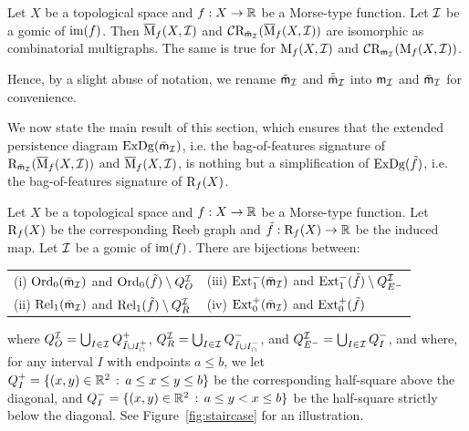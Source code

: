 \begin{lem}\label{lem:idemMapper}
Let $X$ be a topological space and $f:X\rightarrow\mathbb{R}$ be a Morse-type function.
Let $\mathcal{I}$ be a gomic of $\mathrm{im}(f)$.
Then $\overline{\mathrm{M}}_f(X,\mathcal{I})$ and $\mathcal C\mathrm{R}_{\bar {\sf{m}}_{\mathcal I}}(\overline{\mathrm{M}}_f(X,\mathcal{I}))$ are isomorphic as combinatorial multigraphs.
The same is true for $\mathrm{M}_f(X,\mathcal{I})$ and $\mathcal C\mathrm{R}_{{\sf m}_{\mathcal I}}(\mathrm{M}_f(X,\mathcal{I}))$.
\end{lem}  


Hence, by a slight abuse of notation, we rename $\tilde{\sf m}_{\mathcal{I}}$ %
and  $\tilde{\bar{\sf m}}_{\mathcal{I}}$ %
into ${\sf m}_{\mathcal I}$ and $\bar {\sf{m}}_{\mathcal I}$ for convenience. 

We now state the main result of this section, which ensures that the extended persistence diagram $\mathrm{ExDg}(\bar {\sf{m}}_{\mathcal I})$, i.e. the bag-of-features signature of 
$\mathrm{R}_{\bar {\sf{m}}_{\mathcal I}}(\overline{\mathrm{M}}_f(X,\mathcal{I}))$ and $\overline{\mathrm{M}}_f(X,\mathcal{I})$,  
is nothing but a simplification of  $\mathrm{ExDg}(\tilde f)$, i.e. the bag-of-features signature of $\mathrm{R}_{f}(X)$.

\begin{thm}
\label{th:ExDgMultiNerve}
Let $X$ be a topological space and $f:X\rightarrow\mathbb{R}$ be a Morse-type function. Let $\mathrm{R}_f(X)$ be the corresponding Reeb graph
and $\tilde f : \mathrm{R}_f(X)\rightarrow\mathbb{R}$ be the induced map.
Let $\mathcal{I}$ be a gomic of ${\rm im}(f)$. %
There are bijections between:

\begin{center}
\begin{tabular}{ll}
{\rm (i)} %
$\mathrm{Ord}_0(\bar {\sf{m}}_{\mathcal I})$ 
and $\mathrm{Ord}_0(\tilde f)\setminus Q_O^{\mathcal{I}}$ & 
{\rm (iii)} %
$\mathrm{Ext}_1^-(\bar {\sf{m}}_{\mathcal I})$ 
and $\mathrm{Ext}_1^-(\tilde f)\setminus Q_{E^-}^{\mathcal{I}}$\\[0.5em]
{\rm (ii)} %
$\mathrm{Rel}_1(\bar {\sf{m}}_{\mathcal I})$ 
and $\mathrm{Rel}_1(\tilde f)\setminus Q_R^{\mathcal{I}}$ &
{\rm (iv)} %
$\mathrm{Ext}_0^+(\bar {\sf{m}}_{\mathcal I})$ 
and $\mathrm{Ext}_0^+(\tilde f)$
\end{tabular}
\end{center}
where $Q_O^{\mathcal I}=\bigcup_{I\in\mathcal{I}}Q_{{\tilde I}\cup I_\cap^+}^+$,
$Q_R^{\mathcal I}=\bigcup_{I\in\mathcal{I}}Q_{{\tilde I}\cup I_\cap^-}^-$, and
$Q_{E^-}^{\mathcal I}=\bigcup_{I\in\mathcal{I}}Q_I^-$, and where, for any interval $I$ with endpoints $a\leq b$, we let
$Q_I^+ =\{(x,y)\in\mathbb{R}^2\,:\, a\leq x\leq y\leq b\}$ be the corresponding half-square
above the diagonal, and $Q_I^- =\{(x,y)\in\mathbb{R}^2\,:\, a\leq y< x\leq
b\}$ be  the half-square strictly below the diagonal. See Figure~\ref{fig:staircase} for an illustration.
\end{thm}

